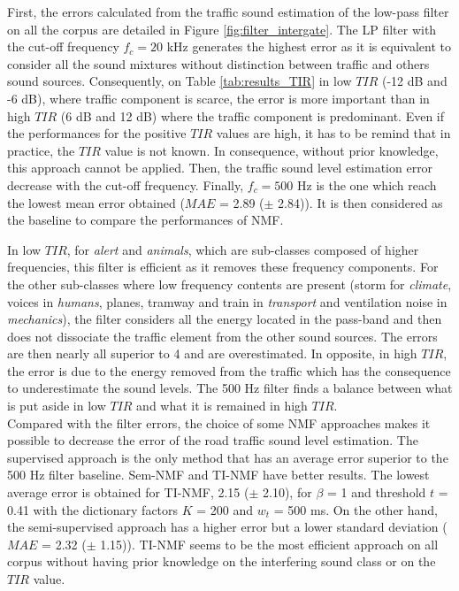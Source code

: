 \documentclass[twocolumn]{svjour3}          %
\begin{document}
First, the errors calculated from the traffic sound estimation of the low-pass filter on all the corpus are detailed in Figure \ref{fig:filter_intergate}. The LP filter with the cut-off frequency $f_c = 20 $ kHz generates the highest error as it is equivalent to consider all the sound mixtures without distinction between traffic and others sound sources. Consequently, on Table \ref{tab:results_TIR} in low $TIR$ (-12 dB and -6 dB), where traffic component is scarce, the error is more important than in high $TIR$ (6 dB and 12 dB) where the traffic component is predominant. Even if the performances for the positive $TIR$ values are high, it has to be remind that in practice, the $TIR$ value is not known. In consequence, without prior knowledge, this approach cannot be applied. Then, the traffic sound level estimation error decrease with the cut-off frequency. Finally, $f_c = 500$ Hz is the one which reach the lowest mean error obtained ($MAE$ = 2.89 ($\pm$ 2.84)). It is then considered as the baseline to compare the performances of NMF.

In low $TIR$, for \textit{alert} and \textit{animals}, which are sub-classes composed of higher frequencies, this filter is efficient as it removes these frequency components. For the other sub-classes where low frequency contents are present (storm for \textit{climate}, voices in \textit{humans}, planes, tramway and train in \textit{transport} and ventilation noise in \textit{mechanics}), the filter considers all the energy located in the pass-band and then does not dissociate the traffic element from the other sound sources. The errors are then nearly all superior to 4 and are overestimated. In opposite, in high $TIR$, the error is due to the energy removed from the traffic which has the consequence to underestimate the sound levels. The 500 Hz filter finds a balance between what is put aside in low $TIR$ and what it is remained in high $TIR$. \\

Compared with the filter errors, the choice of some NMF approaches makes it possible to decrease the error of the road traffic sound level estimation. The supervised approach is the only method that has an average error superior to the 500 Hz filter baseline. Sem-NMF and TI-NMF have better results. The lowest average error is obtained for TI-NMF,  2.15 ($\pm$ 2.10), for $\beta$ = 1 and threshold $t$ = 0.41 with the dictionary factors $K$ = 200 and $w_t$ = 500 ms. On the other hand, the semi-supervised approach has a higher error but a lower standard deviation ($MAE$ = 2.32 ($\pm$ 1.15)). TI-NMF seems to be the most efficient approach on all corpus without having prior knowledge on the interfering sound class or on the $TIR$ value.
\end{document}
